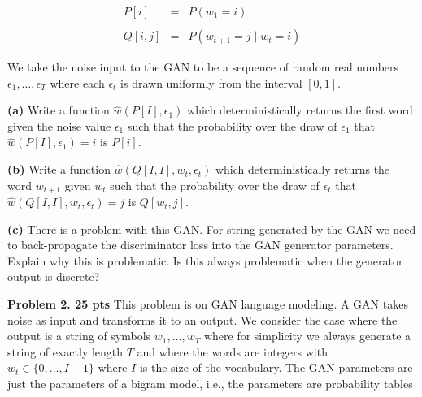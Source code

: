 \documentclass{article}
\newcommand{\solution}[1]{}
\begin{document}
\begin{eqnarray*}
  P[i] & = & P(w_1 = i) \\
  \\
  Q[i,j] & = & P(w_{t+1} = j\;|\; w_t = i)
\end{eqnarray*}

We take the noise input to the GAN to be a sequence of random real numbers $\epsilon_1,\ldots,\epsilon_T$ where each $\epsilon_t$ is drawn uniformly from the interval $[0,1]$.

{\bf (a)} Write a function $\hat{w}(P[I],\epsilon_1)$ which deterministically returns the first word given the noise value $\epsilon_1$ such that the probability over the draw of $\epsilon_1$
that $\hat{w}(P[I],\epsilon_1) = i$ is $P[i]$.

\solution{
  We can take $\hat{w}(P[I],\epsilon_1)$ to be the unique $i$ such that $\epsilon_1 \in \left[\left(\sum_{j<i} P[j]\right),\;\left(\sum_{j \leq i} \;P[j]\right)\right]$
}

{\bf (b)} Write a function $\hat{w}(Q[I,I],w_t,\epsilon_t)$ which deterministically returns the word $w_{t+1}$ given $w_t$ such that the probability over the draw of $\epsilon_t$
that $\hat{w}(Q[I,I],w_t,\epsilon_t) = j$ is $Q[w_t,j]$.

\solution{
  We can take $\hat{w}(Q[I,I],w_t,\epsilon_t)$ to be the unique $w_j$ such that $\epsilon_t \in \left[\left(\sum_{j<i} Q[w_t,j]\right),\;\left(\sum_{k \leq j} \;Q[w_t,j]\right)\right]$
}

{\bf (c)} There is a problem with this GAN.  For string generated by the GAN we need to back-propagate the discriminator loss into the GAN generator parameters.  Explain why this is problematic.
Is this always problematic when the generator output is discrete?

\solution{Yes, there is a problem whever $s$ is discrete. A discrete output will not change under differential updates to the GAN parameters.  Hence the gradient of the discriminator loss
  with respect to the generator parameters is zero.  This will happen for any GAN generatng a discrete output. While there are approaches one can try for discrete GANs, GANs are most effective for modeling
  continuous objects like sounds and images.  It does not help to have the GAN sample from a transformer model. To get a gradient on the generator parameters we need a gradient of the discriminator loss with
  respect to a continuous signal $s$ being generated by the generator.}


\bigskip
{\bf Problem 2. 25 pts}  This problem is on GAN language modeling.  A GAN takes noise as input and transforms it to an output.  We consider the case where the output is a string of symbols $w_1,\ldots, w_T$
where for simplicity we always generate a string of exactly length $T$ and where the words are integers with $w_t \in \{0,\ldots,I-1\}$ where $I$ is the size of the vocabulary.
The GAN parameters are just the parameters of a bigram model, i.e., the parameters are probability tables
\end{document}
